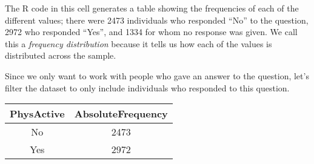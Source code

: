 \documentclass[]{book}
\newenvironment{Shaded}{\begin{snugshade}}{\end{snugshade}}
\newcommand{\KeywordTok}[1]{\textcolor[rgb]{0.13,0.29,0.53}{\textbf{#1}}}
\newcommand{\DataTypeTok}[1]{\textcolor[rgb]{0.13,0.29,0.53}{#1}}
\newcommand{\StringTok}[1]{\textcolor[rgb]{0.31,0.60,0.02}{#1}}
\newcommand{\CommentTok}[1]{\textcolor[rgb]{0.56,0.35,0.01}{\textit{#1}}}
\newcommand{\OperatorTok}[1]{\textcolor[rgb]{0.81,0.36,0.00}{\textbf{#1}}}
\newcommand{\NormalTok}[1]{#1}
\theoremstyle{definition}
\theoremstyle{definition}
\theoremstyle{definition}
\theoremstyle{remark}
\begin{document}
The R code in this cell generates a table showing the frequencies of
each of the different values; there were 2473 individuals who responded
``No'' to the question, 2972 who responded ``Yes'', and 1334 for whom no
response was given. We call this a \emph{frequency distribution} because
it tells us how each of the values is distributed across the sample.

Since we only want to work with people who gave an answer to the
question, let's filter the dataset to only include individuals who
responded to this question.

\begin{Shaded}
\end{Shaded}

\begin{longtable}[]{@{}cc@{}}
\toprule
\begin{minipage}[b]{0.17\columnwidth}\centering\strut
PhysActive\strut
\end{minipage} & \begin{minipage}[b]{0.25\columnwidth}\centering\strut
AbsoluteFrequency\strut
\end{minipage}\tabularnewline
\midrule
\endhead
\begin{minipage}[t]{0.17\columnwidth}\centering\strut
No\strut
\end{minipage} & \begin{minipage}[t]{0.25\columnwidth}\centering\strut
2473\strut
\end{minipage}\tabularnewline
\begin{minipage}[t]{0.17\columnwidth}\centering\strut
Yes\strut
\end{minipage} & \begin{minipage}[t]{0.25\columnwidth}\centering\strut
2972\strut
\end{minipage}\tabularnewline
\bottomrule
\end{longtable}
\end{document}

